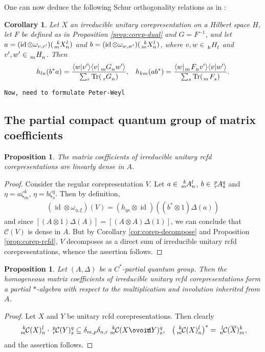 \documentclass[11pt]{article}
\DeclareMathOperator{\id}{id}
\newcommand{\Circt}{{\mathop{\ooalign{$\ovoid$\cr\hidewidth\raise-.05ex\hbox{$\scriptstyle\mathsf T\mkern3.5mu$}\cr}}}} %
\newcommand{\Tr}{\mathrm{Tr}}
\newcommand{\Gr}[5]{\,\tensor*[^{#2}_{#4}]{#1}{^{#3}_{#5}}}%
\newcommand{\Grd}[3]{\Gr{#1}{}{}{#2}{#3}}
\newtheorem{Prop}[Theorem]{Proposition}
\newtheorem{Cor}[Theorem]{Corollary}
\theoremstyle{definition}
\numberwithin{equation}{section}
\begin{document}
One can now deduce the following Schur orthogonality relations as in \cite{}:
\begin{Cor}
  Let $X$ an irreducible
  unitary corepresentation on a Hilbert space $H$, let $F$ be defined as in Proposition \ref{prop:corep-dual} and
  $G=F^{-1}$, and let $a=(\id \otimes \omega_{v,v'})(\Gr{X}{k}{l}{m}{n})$ and $b=(\id \otimes
  \omega_{w,w'})(\Gr{X}{k}{l}{m}{n})$, where $v,w \in \Grd{H}{k}{l}$ and $v',w' \in
  \Grd{H}{m}{n}$.  Then
  \begin{align*} 
    h_{ln}(b^{*}a) &= \frac{\langle w|v'\rangle\langle v|\Grd{G}{m}{n}w'\rangle}{\sum_{r}
      \Tr(\Grd{G}{r}{n})}, &  h_{km}(ab^{*}) = \frac{\langle w|\Grd{F}{m}{n}v'\rangle \langle v|w'\rangle}{\sum_{s}
      \Tr(\Grd{F}{m}{s})}.
  \end{align*}
\end{Cor}

\texttt{Now, need to formulate Peter-Weyl}
 \subsection{The  partial compact quantum group of  matrix coefficients}
\begin{Prop}
  The matrix coefficients of irreducible unitary rcfd corepresentations
  are linearly dense in $A$.
\end{Prop}
\begin{proof}
  Consider the regular corepresentation $V$. Let $a\in \Gr{A}{k}{l}{m}{n}$, $b\in
  \Gr{A}{p}{q}{r}{s}$ and $\eta=a\zeta^{k}_{m}$, $\eta=b\zeta^{q}_{s}$. Then by definition,
  \begin{align*}
    (\id \otimes \omega_{\eta,\xi})(V) = (h_{qs}\otimes \id)((b^{*} \otimes
    1)\Delta(a))
  \end{align*}
  and since $[(A\otimes 1)\Delta(A)]=[(A\otimes A)\Delta(1)]$, we can conclude that $\mathcal{C}(V)$
  is dense in $A$. But by Corollary \ref{cor:corep-decompose} and Proposition \ref{prop:corep-rcfd}, $V$ decomposes as a direct sum of
  irreducible unitary rcfd corepresentations, whence the assertion follows.
\end{proof}
\begin{Prop}
  Let $(A,\Delta)$ be a $C^{*}$-partial quantum group. Then the homogeneous matrix coefficients of
  irreducible unitary rcfd corepresentations form a partial $*$-algebra with respect to the
  multiplication and involution inherited from $A$.
\end{Prop}
\begin{proof}
  Let $X$ and $Y$ be unitary rcfd corepresentations. Then clearly
  \begin{align*}
    \Gr{\mathcal{C}(X)}{k}{l}{m}{n} \cdot \Gr{\mathcal{C}(Y)}{p}{q}{r}{s} &\subseteq
    \delta_{m,p}\delta_{n,r} \Gr{\mathcal{C}(X\Circt Y)}{k}{q}{m}{s}, &
    \left(\Gr{\mathcal{C}(X)}{k}{l}{m}{n}\right)^{*} = \Gr{\mathcal{C}(\overline{X})}{l}{k}{n}{m},
  \end{align*}
and the assertion follows.
\end{proof}
\end{document}
